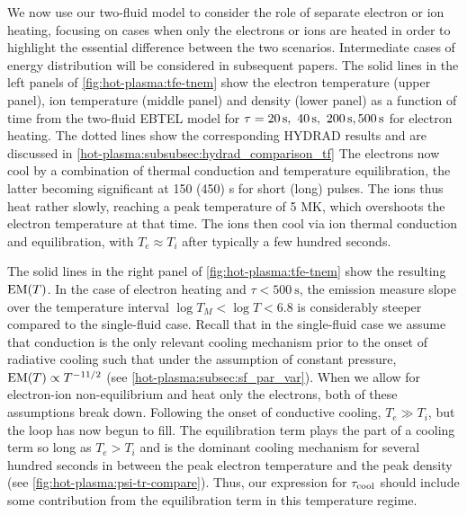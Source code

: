 We now use our two-fluid model to consider the role of separate electron or ion heating, focusing on cases when only the electrons or ions are heated in order to highlight the essential difference between the two scenarios. Intermediate cases of energy distribution will be considered in subsequent papers. The solid lines in the left panels of \autoref{fig:hot-plasma:tfe-tnem} show the electron temperature (upper panel), ion temperature (middle panel) and density (lower panel) as a function of time from the two-fluid EBTEL model for $\tau=\SIlist[list-final-separator = {,}]{20;40;200;500}{\second}$ for electron heating. The dotted lines show the corresponding HYDRAD results and are discussed in \autoref{hot-plasma:subsubsec:hydrad_comparison_tf} The electrons now cool by a combination of thermal conduction and temperature equilibration, the latter becoming significant at 150 (450) s for short (long) pulses. The ions thus heat rather slowly, reaching a peak temperature of 5 MK, which overshoots the electron temperature at that time. The ions then cool via ion thermal conduction and equilibration, with $T_e \approx T_i$ after typically a few hundred seconds.

The solid lines in the right panel of \autoref{fig:hot-plasma:tfe-tnem} show the resulting $\emd[T]$. In the case of electron heating and $\tau<\SI{500}{\second}$, the emission measure slope over the temperature interval $\log{T_M}<\log{T}<6.8$ is considerably steeper compared to the single-fluid case. Recall that in the single-fluid case we assume that conduction is the only relevant cooling mechanism prior to the onset of radiative cooling such that under the assumption of constant pressure, $\emd[T] \propto T^{-11/2}$ (see \autoref{hot-plasma:subsec:sf_par_var}). When we allow for electron-ion non-equilibrium and heat only the electrons, both of these assumptions break down. Following the onset of conductive cooling, $T_e \gg T_i$, but the loop has now begun to fill. The equilibration term plays the part of a cooling term so long as $T_e>T_i$ and is the dominant cooling mechanism for several hundred seconds in between the peak electron temperature and the peak density (see \autoref{fig:hot-plasma:psi-tr-compare}). Thus, our expression for $\tau_\textup{cool}$ should include some contribution from the equilibration term in this temperature regime.

